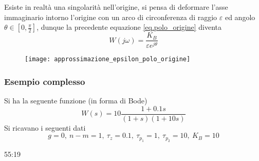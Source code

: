 \begin{figure}[h]
\centering
\def\KB{1}
\end{figure}

Esiste in realtà una singolarità nell'origine, si pensa di deformare l'asse
immaginario intorno l'origine con un arco di circonferenza di raggio
$\varepsilon$ ed angolo $\theta\in[0,\frac{\pi}{2}]$, dunque la precedente
equazione \ref{eq.polo_origine} diventa
$$
W(j\omega) = \frac{K_B}{\varepsilon e^{j\theta}}
$$
\begin{figure}[h]
\centering
\texttt{[image: approssimazione\_epsilon\_polo\_origine]}
\end{figure}

\subsubsection{Esempio complesso}
Si ha la seguente funzione (in forma di Bode)
$$
W(s) = 10 \frac{1+0.1s}{(1+s)(1+10s)}
$$
Si ricavano i seguenti dati
$$
g=0,\ n-m=1,\ \tau_z=0.1,\ \tau_{p_1}=1,\
\tau_{p_2} = 10,\ K_B = 10
$$

\begin{figure}[h]
\centering
{}
\end{figure}
55:19
